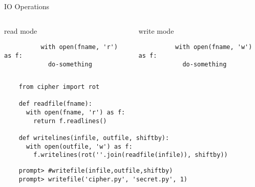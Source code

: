 \begin{frame}[fragile]{IO Operations}
  \begin{columns}[T]
    \begin{column}{0.48\textwidth}
      \begin{block}{read mode}
        \begin{verbatim}
          with open(fname, 'r') as f:
            do-something
        \end{verbatim}
      \end{block}
    \end{column}
    \hfill

    \begin{column}{0.48\textwidth}
      \begin{block}{write mode}
        \begin{verbatim}
          with open(fname, 'w') as f:
            do-something
        \end{verbatim}
      \end{block}
    \end{column}
  \end{columns}

  \begin{verbatim}
    from cipher import rot

    def readfile(fname):
      with open(fname, 'r') as f:
        return f.readlines()

    def writelines(infile, outfile, shiftby):
      with open(outfile, 'w') as f:
        f.writelines(rot(''.join(readfile(infile)), shiftby))
  \end{verbatim}

  \begin{verbatim}
    prompt> #writefile(infile,outfile,shiftby)
    prompt> writefile('cipher.py', 'secret.py', 1)
  \end{verbatim}

\end{frame}
